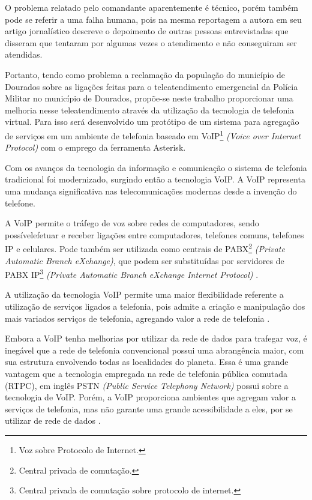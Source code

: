 O problema relatado pelo comandante aparentemente é técnico, porém também pode se referir a uma falha humana, pois na mesma reportagem a autora  em seu artigo jornalístico descreve o depoimento de outras pessoas entrevistadas que disseram que tentaram por algumas vezes o atendimento e não conseguiram ser atendidas.

Portanto, tendo como problema a reclamação da população do município de Dourados sobre as ligações feitas para o teleatendimento emergencial da Polícia Militar no município de Dourados, propõe-se neste trabalho proporcionar uma melhoria nesse teleatendimento através da utilização da tecnologia de telefonia virtual. Para isso será desenvolvido um protótipo de um sistema para agregação de serviços em um ambiente de telefonia baseado em VoIP\footnote{Voz sobre Protocolo de Internet.} \textit{(Voice over Internet Protocol)} com o emprego da ferramenta Asterisk.

Com os avanços da tecnologia da informação e comunicação o sistema de telefonia tradicional foi modernizado, surgindo então a tecnologia VoIP. A VoIP representa uma mudança significativa nas telecomunicações modernas desde a invenção do telefone.

A VoIP permite o tráfego de voz sobre redes de computadores, sendo possívelefetuar e receber ligações entre computadores, telefones comuns, telefones IP e celulares. Pode também ser utilizada como centrais de PABX\footnote{Central privada de comutação.} \textit{(Private Automatic Branch eXchange)}, que podem ser substituídas por servidores de PABX IP\footnote{Central privada de comutação sobre protocolo de internet.} \textit{(Private Automatic Branch eXchange Internet Protocol)} \cite{glauciadasilvaribeiro2011}.

A utilização da tecnologia VoIP permite uma maior flexibilidade referente a utilização de serviços ligados a telefonia, pois admite a criação e manipulação dos mais variados serviços de telefonia, agregando valor a rede de telefonia \cite{andreagiardino2005}.

Embora a VoIP tenha melhorias por utilizar da rede de dados para trafegar voz, é inegável que a rede de telefonia convencional possui uma abrangência maior, com sua estrutura envolvendo todas as localidades do planeta. Essa é uma grande vantagem que a tecnologia empregada na rede de telefonia pública comutada (RTPC), em inglês PSTN \textit{(Public Service Telephony Network)} possui sobre a tecnologia de VoIP. Porém, a VoIP proporciona ambientes que agregam valor a serviços de telefonia, mas não garante uma grande acessibilidade a eles, por se utilizar de rede de dados \cite{theodorewallingford2005}.

